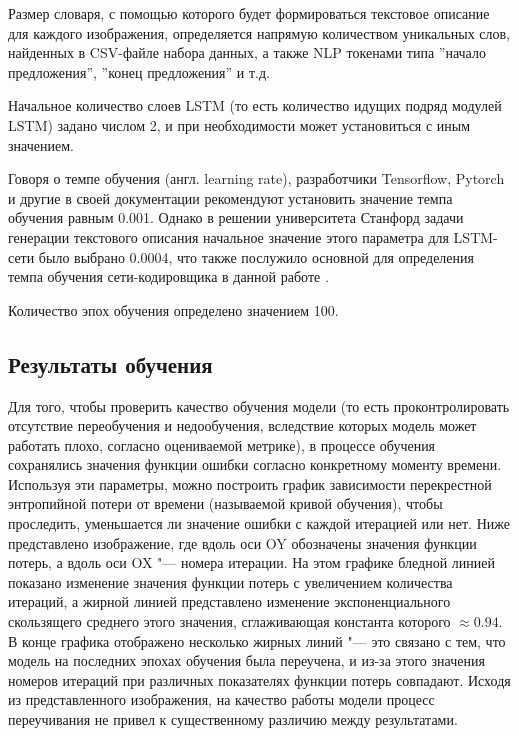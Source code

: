 \documentclass[bachelor, och, coursework]{SCWorks}
\begin{document}
        Размер словаря, с помощью которого будет формироваться текстовое
        описание для каждого изображения, определяется напрямую количеством
        уникальных слов, найденных в CSV-файле набора данных, а также NLP
        токенами типа ''начало предложения'', ''конец предложения'' и т.д.
        
        Начальное количество слоев LSTM (то есть количество идущих подряд
        модулей LSTM) задано числом 2, и при необходимости может установиться с
        иным значением.
        
        Говоря о темпе обучения (англ. learning rate), разработчики Tensorflow,
        Pytorch и другие в своей документации рекомендуют установить значение
        темпа обучения равным 0.001. Однако в решении университета Станфорд
        задачи генерации текстового описания начальное значение этого параметра
        для LSTM-сети было выбрано 0.0004, что также послужило основной для
        определения темпа обучения сети-кодировщика в данной работе
        \cite{learningrate}.
        
        Количество эпох обучения определено значением 100.


    \subsection{Результаты обучения}

        Для того, чтобы проверить качество обучения модели (то есть
        проконтролировать отсутствие переобучения и недообучения, вследствие
        которых модель может работать плохо, согласно оцениваемой метрике), в
        процессе обучения сохранялись значения функции ошибки согласно
        конкретному моменту времени. Используя эти параметры, можно построить
        график зависимости перекрестной энтропийной потери от времени
        (называемой кривой обучения), чтобы проследить, уменьшается ли значение
        ошибки с каждой итерацией или нет. Ниже представлено изображение, где
        вдоль оси OY обозначены значения функции потерь, а вдоль оси OX "---
        номера итерации. На этом графике бледной линией показано изменение
        значения функции потерь с увеличением количества итераций, а жирной
        линией представлено изменение экспоненциального скользящего среднего
        этого значения, сглаживающая константа которого $\approx 0.94$. В конце
        графика отображено несколько жирных линий "--- это связано с тем, что
        модель на последних эпохах обучения была переучена, и из-за этого
        значения номеров итераций при различных показателях функции потерь
        совпадают. Исходя из представленного изображения, на качество работы
        модели процесс переучивания не привел к существенному различию между
        результатами.
        
\end{document}
